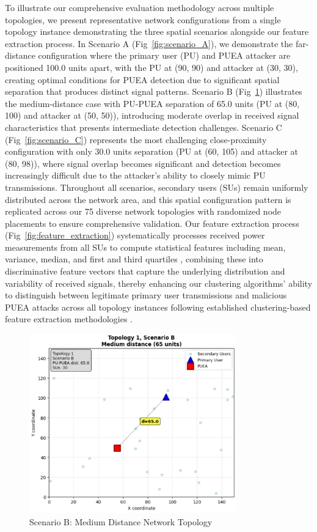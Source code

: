 \documentclass[pdflatex,sn-mathphys-num]{sn-jnl}%
\theoremstyle{thmstyleone}
\theoremstyle{thmstyletwo}
\theoremstyle{thmstylethree}
\begin{document}
\noindent
To illustrate our comprehensive evaluation methodology across multiple topologies, we present representative network configurations from a single topology instance demonstrating the three spatial scenarios alongside our feature extraction process. In Scenario A (Fig~\ref{fig:scenario_A}), we demonstrate the far-distance configuration where the primary user (PU) and PUEA attacker are positioned 100.0 units apart, with the PU at (90, 90) and attacker at (30, 30), creating optimal conditions for PUEA detection due to significant spatial separation that produces distinct signal patterns. Scenario B (Fig~\ref{fig:scenario_B}) illustrates the medium-distance case with PU-PUEA separation of 65.0 units (PU at (80, 100) and attacker at (50, 50)), introducing moderate overlap in received signal characteristics that presents intermediate detection challenges. Scenario C (Fig~\ref{fig:scenario_C}) represents the most challenging close-proximity configuration with only 30.0 units separation (PU at (60, 105) and attacker at (80, 98)), where signal overlap becomes significant and detection becomes increasingly difficult due to the attacker's ability to closely mimic PU transmissions. Throughout all scenarios, secondary users (SUs) remain uniformly distributed across the network area, and this spatial configuration pattern is replicated across our 75 diverse network topologies with randomized node placements to ensure comprehensive validation. Our feature extraction process (Fig~\ref{fig:feature_extraction}) systematically processes received power measurements from all SUs to compute statistical features including mean, variance, median, and first and third quartiles \cite{ref13}, combining these into discriminative feature vectors that capture the underlying distribution and variability of received signals, thereby enhancing our clustering algorithms' ability to distinguish between legitimate primary user transmissions and malicious PUEA attacks across all topology instances following established clustering-based feature extraction methodologies \cite{ref13}.


\begin{figure}[!t]
\centering
\includegraphics[width=0.8\textwidth]{figures/scenario B system model.png}
\caption{Scenario B: Medium Distance Network Topology}
\label{fig:scenario_B}
\end{figure}
\end{document}
